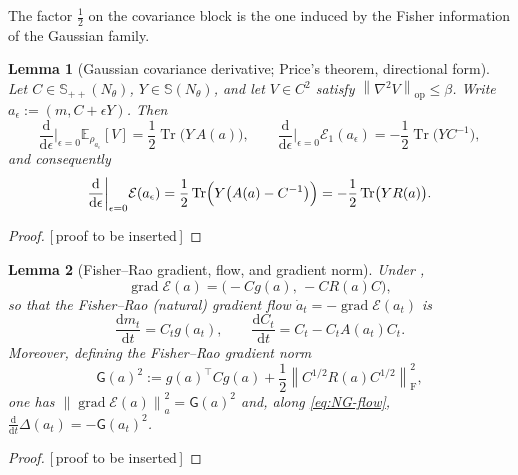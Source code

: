 \documentclass[11pt]{article}
\theoremstyle{plain}
\newtheorem{lemma}[lemma]{Lemma}
\theoremstyle{definition}
\theoremstyle{remark}
\newcommand{\E}{\mathbb{E}}
\newcommand{\Tr}{\operatorname{Tr}}
\newcommand{\SPD}{\mathbb{S}_{++}}
\newcommand{\Sym}{\mathbb{S}}
\newcommand{\dd}{\mathrm{d}}
\newcommand{\grad}{\operatorname{grad}}
\newcommand{\op}{\mathrm{op}}
\newcommand{\Frob}{\mathrm{F}}
\newcommand{\calE}{\mathcal{E}}
\newcommand{\norm}[1]{\left\lVert #1\right\rVert}
\newcommand{\Gradnorm}{\mathsf{G}}
\newcommand{\PROOFHOLE}{{\color{red}\textsf{[\,proof to be inserted\,]}}}
\begin{document}
The factor $\tfrac12$ on the covariance block is the one induced by the Fisher information of the
Gaussian family.

\begin{lemma}[Gaussian covariance derivative; Price's theorem, directional form]
\label{lem:price-derivative}
Let $C\in\SPD(N_\theta)$, $Y\in\Sym(N_\theta)$, and let $V\in C^2$ satisfy
$\norm{\nabla^2V}_\op\leq\beta$. Write $a_\epsilon:=(m,C+\epsilon Y)$. Then
\begin{equation}
\label{eq:price-directional}
    \frac{\dd}{\dd\epsilon}\bigg|_{\epsilon=0}\E_{\rho_{a_\epsilon}}[V]
    =\frac12\Tr\bigl(Y\,A(a)\bigr),
    \qquad
    \frac{\dd}{\dd\epsilon}\bigg|_{\epsilon=0}\calE_1(a_\epsilon)
    =-\frac12\Tr\bigl(YC^{-1}\bigr),
\end{equation}
and consequently
\begin{equation}
\label{eq:E-directional}
    \frac{\dd}{\dd\epsilon}\bigg|_{\epsilon=0}\calE(a_\epsilon)
    =\frac12\Tr\Bigl(Y\bigl(A(a)-C^{-1}\bigr)\Bigr)
    =-\frac12\Tr\bigl(Y R(a)\bigr).
\end{equation}
\end{lemma}

\begin{proof}
\PROOFHOLE
\end{proof}

\begin{lemma}[Fisher--Rao gradient, flow, and gradient norm]
\label{lem:FR-gradient}
Under ,
\begin{equation}
\label{eq:FR-grad}
    \grad\calE(a)=\bigl(-Cg(a),\,-CR(a)C\bigr),
\end{equation}
so that the Fisher--Rao (natural) gradient flow $\dot a_t=-\grad\calE(a_t)$ is
\begin{equation}
\label{eq:NG-flow}
    \frac{\dd m_t}{\dd t}=C_tg(a_t),
    \qquad
    \frac{\dd C_t}{\dd t}=C_t-C_tA(a_t)C_t .
\end{equation}
Moreover, defining the Fisher--Rao gradient norm
\begin{equation}
\label{eq:G-norm}
    \Gradnorm(a)^2:=g(a)^\top Cg(a)+\frac12\norm{C^{1/2}R(a)C^{1/2}}_{\Frob}^2 ,
\end{equation}
one has $\norm{\grad\calE(a)}_a^2=\Gradnorm(a)^2$ and, along \eqref{eq:NG-flow},
$\tfrac{\dd}{\dd t}\Delta(a_t)=-\Gradnorm(a_t)^2$.
\end{lemma}

\begin{proof}
\PROOFHOLE
\end{proof}
\end{document}
